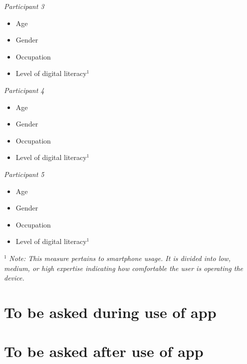 \documentclass{article}
\begin{document}
\textit{Participant 3}
\begin{itemize}
    \item Age
    \item Gender
    \item Occupation
    \item Level of digital literacy$^1$
\end{itemize}

\textit{Participant 4}
\begin{itemize}
    \item Age
    \item Gender
    \item Occupation
    \item Level of digital literacy$^1$
\end{itemize}

\textit{Participant 5}
\begin{itemize}
    \item Age
    \item Gender
    \item Occupation
    \item Level of digital literacy$^1$
\end{itemize}
$^1$ \textit{Note: This measure pertains to smartphone usage. It is divided into low, medium, or high expertise indicating how
comfortable the user is operating the device. }

\section{To be asked during use of app}

\section{To be asked after use of app}
\end{document}
